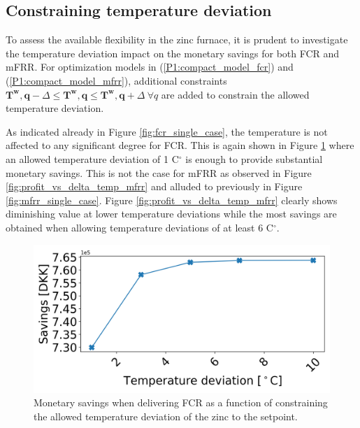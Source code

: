 \documentclass[conference]{IEEEtran}
\begin{document}
\subsection{Constraining temperature deviation}

To assess the available flexibility in the zinc furnace, it is prudent to investigate the temperature deviation impact on the monetary savings for both FCR and mFRR. For optimization models in (\ref{P1:compact_model_fcr}) and (\ref{P1:compact_model_mfrr}), additional constraints $\bm{T^{w},q} - \Delta \leq \bm{T^{w},q} \leq \bm{T^{w},q} + \Delta \ \forall{q}$ are added to constrain the allowed temperature deviation.

As indicated already in Figure \ref{fig:fcr_single_case}, the temperature is not affected to any significant degree for FCR. This is again shown in Figure \ref{fig:profit_vs_delta_temp_fcr} where an allowed temperature deviation of 1 C$^{\circ}$ is enough to provide substantial monetary savings. This is not the case for mFRR as observed in Figure \ref{fig:profit_vs_delta_temp_mfrr} and alluded to previously in Figure \ref{fig:mfrr_single_case}. Figure \ref{fig:profit_vs_delta_temp_mfrr} clearly shows diminishing value at lower temperature deviations while the most savings are obtained when allowing temperature deviations of at least 6 C$^{\circ}$.

\begin{figure}[t]
    \centering
    \includegraphics[width=\columnwidth]{../figures/profit_vs_delta_temp_fcr.png}
    \caption{Monetary savings when delivering FCR as a function of constraining the allowed temperature deviation of the zinc to the setpoint.}
    \label{fig:profit_vs_delta_temp_fcr}
\end{figure}


\end{document}
